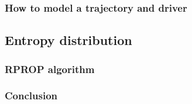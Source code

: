 %
%


\subsubsection{How to model a trajectory and driver}


\subsection{Entropy distribution}


\subsubsection{RPROP algorithm}

\subsubsection{Conclusion}


%



















